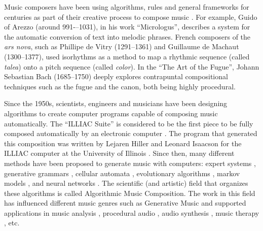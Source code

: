 Music composers have been using algorithms, rules and general frameworks for centuries as part of
their creative process to compose music \cite{nierhaus2009algorithmic}. For example, Guido of Arezzo
(around 991-–1031), in his work ``Micrologus'', describes a system for the automatic conversion of
text into melodic phrases. French composers of the \textit{ars nova}, such as Phillipe de Vitry (1291--1361) and
Guillaume de Machaut (1300--1377), used isorhythms as a method to map a rhythmic sequence
(called \textit{talea}) onto a pitch sequence (called \textit{color}). In the ``The Art of the Fugue'',
Johann Sebastian Bach (1685--1750) deeply explores contrapuntal compositional techniques such as
the fugue and the canon, both being highly procedural.

Since the 1950s, scientists, engineers and musicians have been designing algorithms to create computer
programs capable of composing music automatically. The ``ILLIAC Suite'' is considered to be
the first piece to be fully composed automatically by an electronic computer \cite{nierhaus2009algorithmic}.
The program that generated this composition was written by Lejaren Hiller and Leonard Isaacson
for the ILLIAC computer at the University of Illinois \cite{hiller1957musical}.
Since then, many different methods have been proposed to generate music with computers:
expert systems \cite{}, generative grammars \cite{}, cellular automata \cite{},
evolutionary algorithms \cite{}, markov models \cite{}, and neural networks \cite{}.
The scientific (and artistic) field that organizes these algorithms is called Algorithmic Music Composition.
The work in this field has influenced different music genres such as Generative Music
\cite{eno1996generative} and supported applications in music analysis
\cite{lerdahl1996generative}, procedural audio \cite{farnell2007introduction},
audio synthesis \cite{engel2017neural}, music therapy \cite{williams2020use}, etc.

